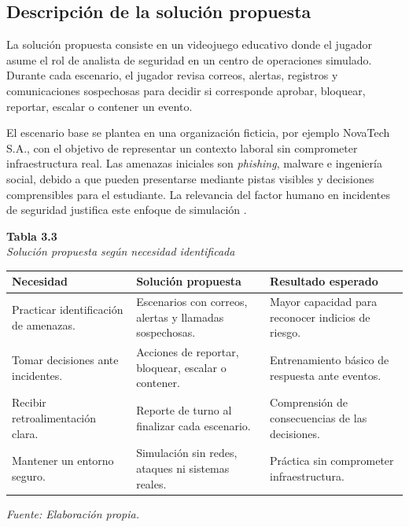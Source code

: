 \subsection{Descripci\'{o}n de la soluci\'{o}n propuesta}

La soluci\'{o}n propuesta consiste en un videojuego educativo donde el jugador asume el rol de analista de seguridad en un centro de operaciones simulado. Durante cada escenario, el jugador revisa correos, alertas, registros y comunicaciones sospechosas para decidir si corresponde aprobar, bloquear, reportar, escalar o contener un evento.

El escenario base se plantea en una organizaci\'{o}n ficticia, por ejemplo NovaTech S.A., con el objetivo de representar un contexto laboral sin comprometer infraestructura real. Las amenazas iniciales son \textit{phishing}, malware e ingenier\'{i}a social, debido a que pueden presentarse mediante pistas visibles y decisiones comprensibles para el estudiante. La relevancia del factor humano en incidentes de seguridad justifica este enfoque de simulaci\'{o}n \parencite{verizon2025dbir}.

\begin{center}
\textbf{Tabla 3.3}\\
\textit{Soluci\'{o}n propuesta seg\'{u}n necesidad identificada}

\vspace{0.2cm}
\begin{tabular}{|p{}|p{}|p{}|}
\hline
\textbf{Necesidad} & \textbf{Soluci\'{o}n propuesta} & \textbf{Resultado esperado} \\
\hline
Practicar identificaci\'{o}n de amenazas. & Escenarios con correos, alertas y llamadas sospechosas. & Mayor capacidad para reconocer indicios de riesgo. \\
\hline
Tomar decisiones ante incidentes. & Acciones de reportar, bloquear, escalar o contener. & Entrenamiento b\'{a}sico de respuesta ante eventos. \\
\hline
Recibir retroalimentaci\'{o}n clara. & Reporte de turno al finalizar cada escenario. & Comprensi\'{o}n de consecuencias de las decisiones. \\
\hline
Mantener un entorno seguro. & Simulaci\'{o}n sin redes, ataques ni sistemas reales. & Pr\'{a}ctica sin comprometer infraestructura. \\
\hline
\end{tabular}

\textit{Fuente: Elaboraci\'{o}n propia.}
\end{center}

